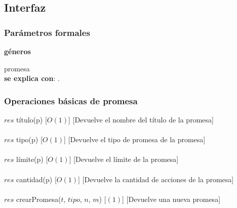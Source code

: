 \subsection{Interfaz}


  \subsubsection{Par\'ametros formales}
   \parbox{1.7cm}{\textbf{g\'eneros}} promesa\\

  \textbf{se explica con}: .


  \subsubsection{Operaciones b\'asicas de promesa}
  {$res$ \igobs t\'itulo(p)}
  [$O(1)$]
  [Devuelve el nombre del t\'itulo de la promesa]\\\\
  {$res$ \igobs tipo(p)}
  [$O(1)$]
  [Devuelve el tipo de promesa de la promesa]\\\\
  {$res$ \igobs l\'imite(p)}
  [$O(1)$]
  [Devuelve el l\'imite de la promesa]\\\\
  {$res$ \igobs cantidad(p)}
  [$O(1)$]
  [Devuelve la cantidad de acciones de la promesa]\\\\
  {$res$ \igobs crearPromesa($t$, $tipo$, $n$, $m$)}
  [$(1)$]
  [Devuelve una nueva promesa]\\\\


